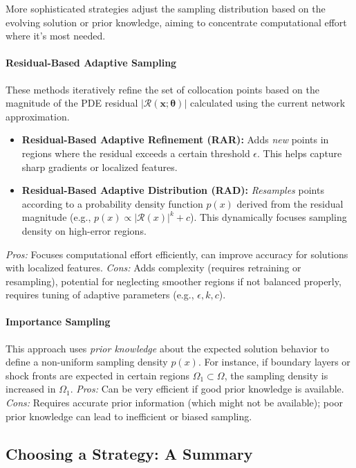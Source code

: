 More sophisticated strategies adjust the sampling distribution based on the evolving solution or prior knowledge, aiming to concentrate computational effort where it's most needed.

\paragraph{Residual-Based Adaptive Sampling} These methods iteratively refine the set of collocation points based on the magnitude of the PDE residual $| \mathcal{R}(\mathbf{x}; \boldsymbol{\theta}) |$ calculated using the current network approximation.
\begin{itemize}
    \item \textbf{Residual-Based Adaptive Refinement (RAR):} Adds \textit{new} points in regions where the residual exceeds a certain threshold $\epsilon$. This helps capture sharp gradients or localized features.
    \item \textbf{Residual-Based Adaptive Distribution (RAD):} \textit{Resamples} points according to a probability density function $p(x)$ derived from the residual magnitude (e.g., $p(x) \propto |\mathcal{R}(x)|^k + c$). This dynamically focuses sampling density on high-error regions.
\end{itemize}
\textit{Pros:} Focuses computational effort efficiently, can improve accuracy for solutions with localized features. \textit{Cons:} Adds complexity (requires retraining or resampling), potential for neglecting smoother regions if not balanced properly, requires tuning of adaptive parameters (e.g., $\epsilon, k, c$).

\paragraph{Importance Sampling} This approach uses \textit{prior knowledge} about the expected solution behavior to define a non-uniform sampling density $p(x)$. For instance, if boundary layers or shock fronts are expected in certain regions $\Omega_1 \subset \Omega$, the sampling density is increased in $\Omega_1$.
\textit{Pros:} Can be very efficient if good prior knowledge is available. \textit{Cons:} Requires accurate prior information (which might not be available); poor prior knowledge can lead to inefficient or biased sampling.

\subsection{Choosing a Strategy: A Summary}

